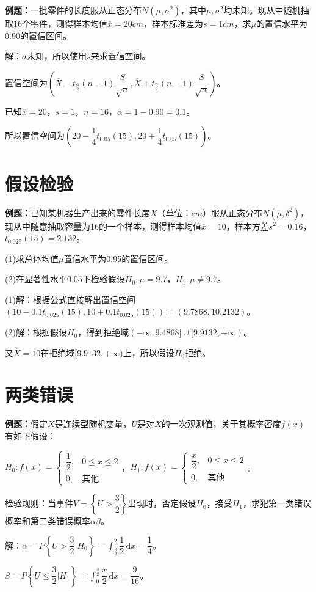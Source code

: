 \documentclass[UTF8, 12pt]{ctexart}
\begin{document}
\textbf{例题：}一批零件的长度服从正态分布$N(\mu,\sigma^2)$，其中$\mu,\sigma^2$均未知。现从中随机抽取16个零件，测得样本均值$\overline{x}=20cm$，样本标准差为$s=1cm$，求$\mu$的置信水平为0.90的置信区间。

解：$\sigma$未知，所以使用$s$来求置信空间。

置信空间为$(\overline{X}-t_\frac{\alpha}{2}(n-1)\dfrac{S}{\sqrt{n}},\overline{X}+t_\frac{\alpha}{2}(n-1)\dfrac{S}{\sqrt{n}})$。

已知$\overline{x}=20$，$s=1$，$n=16$，$\alpha=1-0.90=0.1$。

所以置信空间为$\left(20-\dfrac{1}{4}t_{0.05}(15),20+\dfrac{1}{4}t_{0.05}(15)\right)$。

\section{假设检验}

\textbf{例题：}已知某机器生产出来的零件长度$X$（单位：$cm$）服从正态分布$N(\mu,\delta^2)$，现从中随意抽取容量为16的一个样本，测得样本均值$\overline{x}=10$，样本方差$s^2=0.16$，$t_{0.025}(15)=2.132$。

(1)求总体均值$\mu$置信水平为0.95的置信区间。

(2)在显著性水平$0.05$下检验假设$H_0:\mu=9.7$，$H_1:\mu\neq9.7$。

(1)解：根据公式直接解出置信空间$(10-0.1t_{0.025}(15),10+0.1t_{0.025}(15))=(9.7868,10.2132)$。

(2)解：根据假设$H_0$，得到拒绝域$(-\infty,9.4868]\cup[9.9132,+\infty)$。

又$\overline{X}=10$在拒绝域$[9.9132,+\infty)$上，所以假设$H_0$拒绝。

\section{两类错误}

\textbf{例题：}假定$X$是连续型随机变量，$U$是对$X$的一次观测值，关于其概率密度$f(x)$有如下假设：

$H_0:f(x)=\left\{\begin{array}{ll}
    \dfrac{1}{2}, & 0\leqslant x\leqslant2 \\
    0, & \text{其他}
\end{array}\right.$，$H_1:f(x)=\left\{\begin{array}{ll}
    \dfrac{x}{2}, & 0\leqslant x\leqslant2 \\
    0, & \text{其他}
\end{array}\right.$。

检验规则：当事件$V=\left\{U>\dfrac{3}{2}\right\}$出现时，否定假设$H_0$，接受$H_1$，求犯第一类错误概率和第二类错误概率$\alpha\beta$。

解：$\alpha=P\left\{U>\dfrac{3}{2}\bigg|H_0\right\}=\displaystyle{\int_\frac{3}{2}^2\dfrac{1}{2}\,\textrm{d}x=\dfrac{1}{4}}$。

$\beta=P\left\{U\leqslant\dfrac{3}{2}\bigg|H_1\right\}=\displaystyle{\int_0^{\frac{3}{2}}\dfrac{x}{2}\,\textrm{d}x=\dfrac{9}{16}}$。
\end{document}
